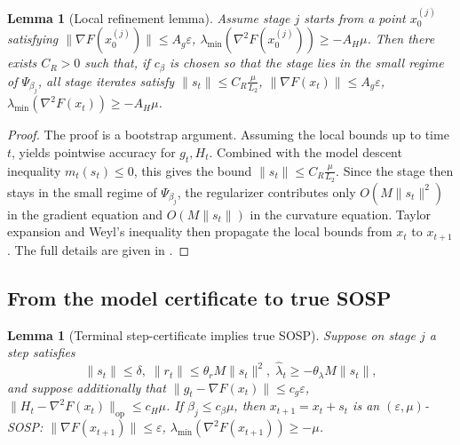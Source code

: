 \documentclass{article}
\theoremstyle{plain}
\newtheorem{lemma}[theorem]{Lemma}
\theoremstyle{definition}
\theoremstyle{remark}
\begin{document}
\begin{lemma}[Local refinement lemma]\label{lem:local-main}
Assume stage \(j\) starts from a point \(x_0^{(j)}\) satisfying
$\|\nabla F(x_0^{(j)})\|\le A_g\varepsilon$,
$\lambda_{\min}(\nabla^2F(x_0^{(j)}))\ge -A_H\mu$. Then there exists \(C_R>0\) such that, if \(c_\beta\) is chosen so that the stage lies in the small regime of \(\Psi_{\beta_j}\), all stage iterates satisfy $\|s_t\|\le C_R\frac{\mu}{L_2}$,
$\|\nabla F(x_t)\|\le A_g\varepsilon$,$\lambda_{\min}(\nabla^2F(x_t))\ge -A_H\mu$.
\end{lemma}

\begin{proof}
The proof is a bootstrap argument. Assuming the local bounds up to time \(t\),  yields pointwise accuracy for \(g_t,H_t\). Combined with the model descent inequality \(m_t(s_t)\le 0\), this gives the bound $\|s_t\|\le C_R\frac{\mu}{L_2}$.
Since the stage then stays in the small regime of \(\Psi_{\beta_j}\), the regularizer contributes only \(O(M\|s_t\|^2)\) in the gradient equation and \(O(M\|s_t\|)\) in the curvature equation. Taylor expansion and Weyl's inequality then propagate the local bounds from \(x_t\) to \(x_{t+1}\). The full details are given in .
\end{proof}

\subsection{From the model certificate to true SOSP}

\begin{lemma}[Terminal step-certificate implies true SOSP]\label{lem:terminal-cert-main}
Suppose on stage \(j\) a step satisfies
\[
\|s_t\|\le \delta,\;
\|r_t\|\le \theta_r M\|s_t\|^2,\;
\widehat\lambda_t\ge -\theta_\lambda M\|s_t\|,
\]
and suppose additionally that
$\|g_t-\nabla F(x_t)\|\le c_g\varepsilon$,
$\|H_t-\nabla^2F(x_t)\|_{\mathrm{op}}\le c_H\mu$.
If \(\beta_j\le c_\beta\mu\), then $x_{t+1}=x_t+s_t$
is an \((\varepsilon,\mu)\)-SOSP: $
\|\nabla F(x_{t+1})\|\le \varepsilon$,
$\lambda_{\min}(\nabla^2F(x_{t+1}))\ge -\mu$.
\end{lemma}
\end{document}

